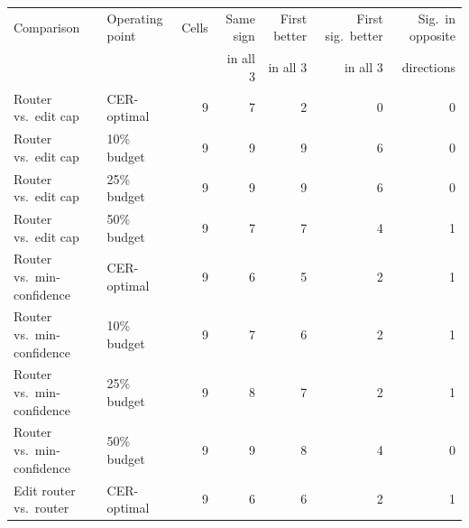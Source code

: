 \begin{tabular}{llrrrrr}
\toprule
Comparison & Operating point & Cells & Same sign & First better & First sig.\ better & Sig.\ in opposite \\
 & & & in all 3 & in all 3 & in all 3 & directions \\
\midrule
Router vs.\ edit cap & CER-optimal & 9 & 7 & 2 & 0 & 0 \\
Router vs.\ edit cap & 10\% budget & 9 & 9 & 9 & 6 & 0 \\
Router vs.\ edit cap & 25\% budget & 9 & 9 & 9 & 6 & 0 \\
Router vs.\ edit cap & 50\% budget & 9 & 7 & 7 & 4 & 1 \\
\addlinespace[2pt]
Router vs.\ min-confidence & CER-optimal & 9 & 6 & 5 & 2 & 1 \\
Router vs.\ min-confidence & 10\% budget & 9 & 7 & 6 & 2 & 1 \\
Router vs.\ min-confidence & 25\% budget & 9 & 8 & 7 & 2 & 1 \\
Router vs.\ min-confidence & 50\% budget & 9 & 9 & 8 & 4 & 0 \\
\addlinespace[2pt]
Edit router vs.\ router & CER-optimal & 9 & 6 & 6 & 2 & 1 \\
\bottomrule
\end{tabular}
